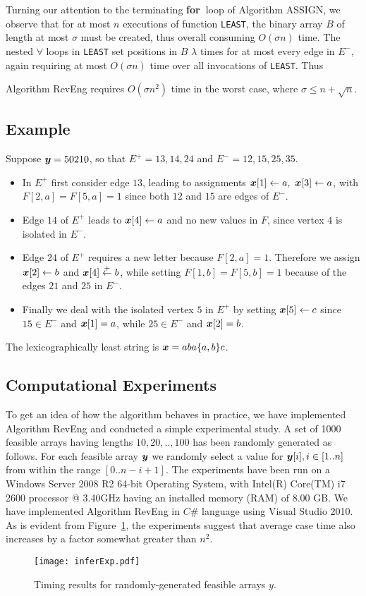 \documentclass[runningheads,a4paper]{llncs}
\def\s#1{\mbox{\boldmath $#1$}}
\def\+{\!+\!}
\def\bfor{{\bf for\ }}
\def\la{\leftarrow}
\begin{document}
Turning our attention to the terminating \bfor loop of Algorithm ASSIGN,
we observe that for at most $n$ executions of function {\tt LEAST}, the binary array $B$
of length at most $\sigma$ must be created,
thus overall consuming $O(\sigma n)$ time.
The nested $\forall$ loops in {\tt LEAST} set positions in $B$ $\lambda$ times
for at most every edge in $E^-$, again requiring at most
$O(\sigma n)$ time over all invocations of {\tt LEAST}.
Thus
\begin{lemma}
Algorithm RevEng requires $O(\sigma n^2)$ time in the worst case,
where $\sigma \le n\+ \sqrt{n}$.
\end{lemma}

\subsection{Example}
Suppose $\s{y} = 50210$, so that
$E^+ = 13,14,24$ and $E^- = 12,15,25,35$.
\begin{itemize}
\item
In $E^+$ first consider edge $13$,
leading to assignments $\s{x}[1] \la a,\ \s{x}[3] \la a$,
with $F[2,a] = F[5,a] = 1$ since both $12$ and $15$ are edges of $E^-$.
\item
Edge $14$ of $E^+$ leads to $\s{x}[4] \la a$ and no new values in $F$,
since vertex $4$ is isolated in $E^-$.
\item
Edge $24$ of $E^+$ requires a new letter because $F[2,a] = 1$.
Therefore we assign $\s{x}[2] \la b$ and $\s{x}[4] \stackrel{+}{\la} b$,
while setting $F[1,b] = F[5,b] = 1$ because of the edges
$21$ and $25$ in $E^-$.
\item
Finally we deal with the isolated vertex $5$ in $E^+$
by setting $\s{x}[5] \la c$ since $15 \in E^-$ and $\s{x}[1] = a$,
while $25 \in E^-$ and $\s{x}[2] = b$.
\end{itemize}
The lexicographically least string
is $\s{x} = a b a \{a,b\} c$.


\subsection{Computational Experiments}
To get an idea of how the algorithm behaves in practice, we have implemented
Algorithm RevEng and conducted a simple experimental study. A set of 1000
feasible arrays having lengths $10, 20, .., 100$ has been randomly generated as
follows. For each feasible array $\s{y}$ we randomly select a value for
$\s{y}[i], i \in [1..n]$ from within the range $[0..n-i+1]$. The experiments
have been run on a Windows Server 2008 R2 64-bit Operating System, with
Intel(R) Core(TM) i7 2600 processor @ 3.40GHz having an installed memory (RAM)
of 8.00 GB. We have implemented Algorithm RevEng in $C\#$ language using Visual
Studio 2010. As is evident from Figure~\ref{fig-tests}, the experiments suggest
that average case time also increases by a factor somewhat greater than $n^2$.
\begin{figure}[t!]
  \centering
  \texttt{[image: inferExp.pdf]}
  \caption{Timing results for randomly-generated feasible arrays
  \s{y}.}
  \label{fig-tests}
\end{figure}
\end{document}
